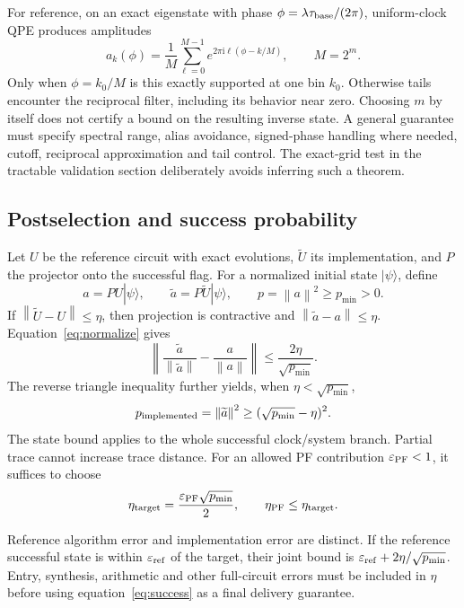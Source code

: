 \documentclass[11pt,a4paper]{article}
\newcommand{\norm}[1]{\left\lVert #1\right\rVert}
\newcommand{\eps}{\varepsilon}
\newcommand{\ip}{\mathrm{i}}
\begin{document}
For reference, on an exact eigenstate with phase $\phi=\lambda\tau_{\rm base}/(2\pi)$, uniform-clock QPE produces amplitudes
\begin{equation}
 a_k(\phi)=\frac{1}{M}\sum_{\ell=0}^{M-1}
 e^{2\pi\ip\ell(\phi-k/M)},\qquad M=2^m.
\end{equation}
Only when $\phi=k_0/M$ is this exactly supported at one bin $k_0$. Otherwise tails encounter the reciprocal filter, including its behavior near zero. Choosing $m$ by itself does not certify a bound on the resulting inverse state. A general guarantee must specify spectral range, alias avoidance, signed-phase handling where needed, cutoff, reciprocal approximation and tail control. The exact-grid test in the tractable validation section deliberately avoids inferring such a theorem.

\subsection{Postselection and success probability}
Let $U$ be the reference circuit with exact evolutions, $\widetilde U$ its implementation, and $P$ the projector onto the successful flag. For a normalized initial state $|\psi\rangle$, define
\begin{equation}
 a=PU|\psi\rangle,\qquad \widetilde a=P\widetilde U|\psi\rangle,
 \qquad p=\norm a^2\geq p_{\min}>0.
\end{equation}
If $\norm{\widetilde U-U}\leq\eta$, then projection is contractive and $\norm{\widetilde a-a}\leq\eta$. Equation~\eqref{eq:normalize} gives
\begin{equation}\label{eq:post}
 \boxed{\norm{\frac{\widetilde a}{\norm{\widetilde a}}-\frac{a}{\norm a}}
 \leq\frac{2\eta}{\sqrt{p_{\min}}}.}
\end{equation}
The reverse triangle inequality further yields, when $\eta<\sqrt{p_{\min}}$,
\begin{equation}\label{eq:success}
 p_{\rm implemented}=\norm{\widetilde a}^2
 \geq(\sqrt{p_{\min}}-\eta)^2.
\end{equation}
The state bound applies to the whole successful clock/system branch. Partial trace cannot increase trace distance. For an allowed PF contribution $\eps_{\rm PF}<1$, it suffices to choose
\begin{equation}\label{eq:budget}
 \eta_{\rm target}=\frac{\eps_{\rm PF}\sqrt{p_{\min}}}{2},
 \qquad \eta_{\rm PF}\leq\eta_{\rm target}.
\end{equation}

Reference algorithm error and implementation error are distinct. If the reference successful state is within $\eps_{\rm ref}$ of the target, their joint bound is $\eps_{\rm ref}+2\eta/\sqrt{p_{\min}}$. Entry, synthesis, arithmetic and other full-circuit errors must be included in $\eta$ before using equation~\eqref{eq:success} as a final delivery guarantee.
\end{document}
